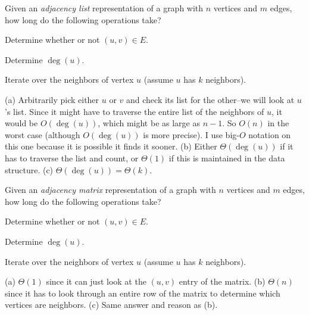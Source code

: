 \begin{requ}
Given an {\em adjacency list} representation of a graph with $n$ vertices and $m$ edges, 
how long do the following operations take?
\begin{lenum}
\item Determine whether or not $(u,v)\in E$.
\item Determine $\deg(u)$.
\item Iterate over the neighbors of vertex $u$ (assume $u$ has $k$ neighbors). 
\end{lenum}
\begin{requanswer}
(a) Arbitrarily pick either $u$ or $v$ and check its list for the other--we will look at $u$'s list.
Since it might have to traverse the entire list of the neighbors of $u$, it would be $O(\deg(u))$,
which might be as large as $n-1$. So $O(n)$ in the worst case (although $O(\deg(u))$ is more precise).
I use big-$O$ notation on this one because it is possible it finds it sooner.
(b) Either $\Theta(\deg(u))$ if it has to traverse the list and count, 
or $\Theta(1)$ if this is maintained in the data structure.
(c) $\Theta(\deg(u))=\Theta(k)$.
\end{requanswer}
\end{requ}

\begin{requ}
Given an {\em adjacency matrix} representation of a graph with $n$ vertices and $m$ edges, 
how long do the following operations take?
\begin{lenum}
\item Determine whether or not $(u,v)\in E$.
\item Determine $\deg(u)$.
\item Iterate over the neighbors of vertex $u$ (assume $u$ has $k$ neighbors). 
\end{lenum}
\begin{requanswer}
(a) $\Theta(1)$ since it can just look at the $(u,v)$ entry of the matrix.
(b) $\Theta(n)$ since it has to look through an entire row of the matrix to determine which vertices are neighbors.
(c) Same answer and reason as (b).
\end{requanswer}
\end{requ}

